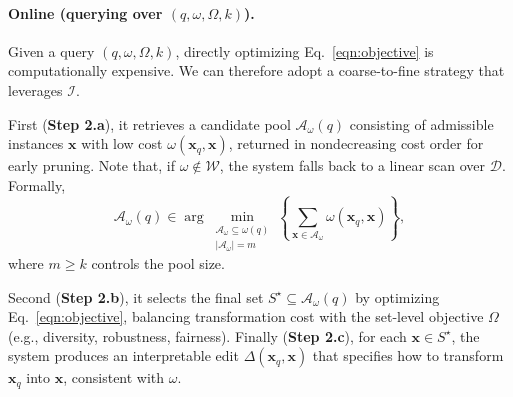 \paragraph{Online (querying over $(q,\omega,\Omega,k)$).}
Given a query $(q,\omega,\Omega,k)$, directly optimizing Eq.~\eqref{eqn:objective} is computationally expensive. We can therefore adopt a coarse-to-fine strategy that leverages $\mathcal I$.

First (\textbf{Step 2.a}), it retrieves a candidate pool $\mathcal A_\omega(q)$ consisting of admissible instances $\mathbf{x}$ with low cost $\omega(\mathbf{x}_q,\mathbf{x})$, returned in nondecreasing cost order for early pruning. Note that, if $\omega \notin \mathcal W$, the system falls back to a linear scan over $\mathcal D$. Formally,
\begingroup\small
\begin{equation}
\mathcal A_\omega(q) 
\in 
\arg\min_{\substack{\mathcal A_\omega \subseteq \mathcal \omega(q)\\ |\mathcal A_\omega|=m}}\left\{
\sum_{\mathbf{x}\in \mathcal A_\omega} \omega(\mathbf{x}_q,\mathbf{x})\right\},
\end{equation}
\endgroup
where $m \ge k$ controls the pool size.

Second (\textbf{Step 2.b}), it selects the final set $S^\star \subseteq \mathcal A_\omega(q)$ by optimizing Eq.~\eqref{eqn:objective}, balancing transformation cost with the set-level objective $\Omega$ (e.g., diversity, robustness, fairness). Finally (\textbf{Step 2.c}), for each $\mathbf{x} \in S^\star$, the system produces an interpretable edit $\Delta(\mathbf{x}_q, \mathbf{x})$ that specifies how to transform $\mathbf{x}_q$ into $\mathbf{x}$, consistent with $\omega$.


